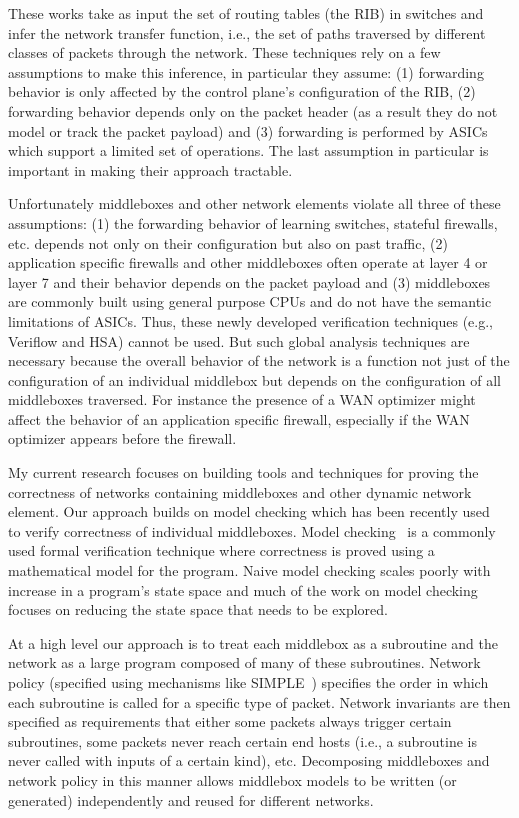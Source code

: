 \documentclass[letterpaper]{article}
\begin{document}
These works take as input the set of routing tables (the RIB) in switches and infer the network transfer function, i.e.,
the set of paths traversed by different classes of packets through the network. These techniques rely on a few
assumptions to make this inference, in particular they assume: (1) forwarding behavior is only affected by the control
plane's configuration of the RIB, (2) forwarding behavior depends only on the packet header (as a result they do not model or track the packet
payload) and (3) forwarding is performed by ASICs which support a limited set of operations. The last assumption in
particular is important in making their approach tractable.

Unfortunately middleboxes and other network elements violate all three of these assumptions: (1) the forwarding behavior
of learning switches, stateful firewalls, etc. depends not only on their configuration but also on past traffic, (2)
application specific firewalls and other middleboxes often operate at layer 4 or layer 7 and their behavior depends on
the packet payload and (3) middleboxes are commonly built using general purpose CPUs and do not have the semantic
limitations of ASICs. Thus, these newly developed verification techniques (e.g., Veriflow and HSA) cannot be used. But such global analysis techniques are necessary because the overall behavior of the
network is a function not just of the configuration of an individual middlebox but depends on the configuration of all
middleboxes traversed. For instance the presence of a WAN optimizer might affect the behavior of an application
specific firewall, especially if the WAN optimizer appears before the firewall.

My current research focuses on building tools and techniques for proving the correctness of networks containing
middleboxes and other dynamic network element. Our approach builds on model checking which has been recently
used~\cite{dobrescu2014software} to verify correctness of individual middleboxes. Model
checking~\cite{jhala2009software, han2007providing} is a commonly used formal verification technique where correctness
is proved using a mathematical model for the program.  Naive model checking scales poorly with increase in a program's
state space and much of the work on model checking focuses on reducing the state space that needs to be explored.

At a high level our approach is to treat each middlebox as a subroutine and the network as a large program composed of
many of these subroutines. Network policy (specified using mechanisms like SIMPLE~\cite{qazi2013simple}) specifies
the order in which each subroutine is called for a specific type of packet. Network invariants are then specified as
requirements that either some packets always trigger certain subroutines, some packets never reach certain end hosts
(i.e., a subroutine is never called with inputs of a certain kind), etc. Decomposing middleboxes and network policy in
this manner allows middlebox models to be written (or generated) independently and reused for different networks.
\end{document}
